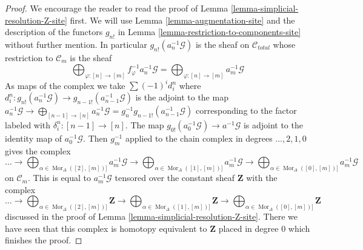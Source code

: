 \documentclass{stacks-project}
\theoremstyle{plain}
\theoremstyle{definition}
\theoremstyle{remark}
\numberwithin{equation}{subsection}
\def\Mor{\mathop{\mathrm{Mor}}\nolimits}
\begin{document}
\begin{proof}
We encourage the reader to read the proof of
Lemma \ref{lemma-simplicial-resolution-Z-site} first.
We will use Lemma \ref{lemma-augmentation-site} and
the description of the functors $g_{n!}$ in
Lemma \ref{lemma-restriction-to-components-site} without further mention.
In particular $g_{n!}(a_n^{-1}\mathcal{G})$ is the
sheaf on $\mathcal{C}_{total}$ whose restriction to $\mathcal{C}_m$
is the sheaf
$$
\bigoplus\nolimits_{\varphi : [n] \to [m]} f_\varphi^{-1}a_n^{-1}\mathcal{G} =
\bigoplus\nolimits_{\varphi : [n] \to [m]} a_m^{-1}\mathcal{G}
$$
As maps of the complex we take $\sum (-1)^i d^n_i$ where
$d^n_i : g_{n!}(a_n^{-1}\mathcal{G}) \to g_{n - 1!}(a_{n - 1}^{-1}\mathcal{G})$
is the adjoint to the map
$a_n^{-1}\mathcal{G} \to \bigoplus_{[n - 1] \to [n]} a_n^{-1}\mathcal{G} =
g_n^{-1}g_{n - 1!}(a_{n - 1}^{-1}\mathcal{G})$
corresponding to the factor labeled with $\delta^n_i : [n - 1] \to [n]$.
The map $g_{0!}(a_0^{-1}\mathcal{G}) \to a^{-1}\mathcal{G}$ is adjoint
to the identity map of $a_0^{-1}\mathcal{G}$.
Then $g_m^{-1}$ applied to the chain complex in degrees
$\ldots, 2, 1, 0$ gives the complex
$$
\ldots \to
\bigoplus\nolimits_{\alpha \in \Mor_\Delta([2], [m])]} a_m^{-1}\mathcal{G} \to
\bigoplus\nolimits_{\alpha \in \Mor_\Delta([1], [m])]} a_m^{-1}\mathcal{G} \to
\bigoplus\nolimits_{\alpha \in \Mor_\Delta([0], [m])]} a_m^{-1}\mathcal{G}
$$
on $\mathcal{C}_m$. This is equal to $a_m^{-1}\mathcal{G}$
tensored over the constant sheaf $\mathbf{Z}$ with the complex
$$
\ldots \to
\bigoplus\nolimits_{\alpha \in \Mor_\Delta([2], [m])]} \mathbf{Z} \to
\bigoplus\nolimits_{\alpha \in \Mor_\Delta([1], [m])]} \mathbf{Z} \to
\bigoplus\nolimits_{\alpha \in \Mor_\Delta([0], [m])]} \mathbf{Z}
$$
discussed in the proof of Lemma \ref{lemma-simplicial-resolution-Z-site}.
There we have seen that this complex is homotopy equivalent to
$\mathbf{Z}$ placed in degree $0$ which finishes the proof.
\end{proof}
\end{document}
